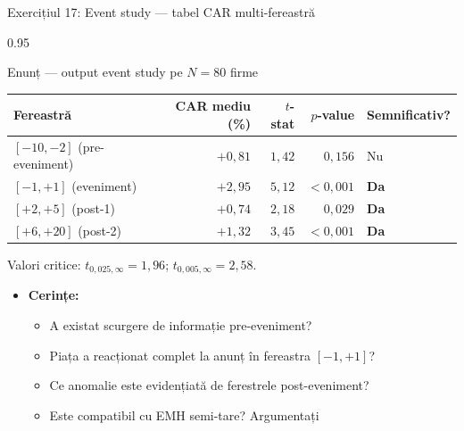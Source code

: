 \documentclass[9pt, aspectratio=169, t]{beamer}
\begin{document}
\begin{frame}[shrink=25]{Exercițiul 17: Event study --- tabel CAR multi-fereastră}
\begin{cminipage}{0.95\textwidth}
\begin{block}{Enunț --- output event study pe $N = 80$ firme}
\small
\renewcommand{\arraystretch}{1.2}
\begin{center}
\begin{tabular}{lrrrl}
\toprule
\textbf{Fereastră} & \textbf{CAR mediu (\%)} & \textbf{$t$-stat} & \textbf{$p$-value} & \textbf{Semnificativ?} \\
\midrule
$[-10, -2]$ (pre-eveniment) & $+0{,}81$ & $1{,}42$ & $0{,}156$ & Nu \\
$[-1, +1]$ (eveniment) & $+2{,}95$ & $5{,}12$ & $< 0{,}001$ & \textbf{Da} \\
$[+2, +5]$ (post-1) & $+0{,}74$ & $2{,}18$ & $0{,}029$ & \textbf{Da} \\
$[+6, +20]$ (post-2) & $+1{,}32$ & $3{,}45$ & $< 0{,}001$ & \textbf{Da} \\
\bottomrule
\end{tabular}
\end{center}
Valori critice: $t_{0{,}025, \infty} = 1{,}96$; $t_{0{,}005, \infty} = 2{,}58$.
\end{block}
\begin{itemize}\setlength{\itemsep}{0pt}
    \item \textbf{Cerințe:}
    \begin{itemize}\setlength{\itemsep}{0pt}
        \item A existat scurgere de informație pre-eveniment?
        \item Piața a reacționat complet la anunț în fereastra $[-1, +1]$?
        \item Ce anomalie este evidențiată de ferestrele post-eveniment?
        \item Este compatibil cu EMH semi-tare? Argumentați
    \end{itemize}
\end{itemize}
\end{cminipage}
\end{frame}
\end{document}
